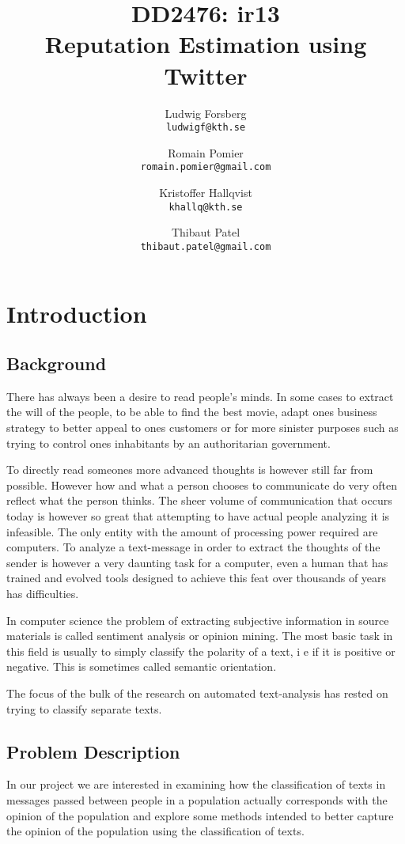 \documentclass[a4paper,12pt]{report}
\title{\TitleFontTwo DD2476: ir13 \\ \TitleFont Reputation Estimation using Twitter}
\author{Ludwig Forsberg \\ \texttt{ludwigf@kth.se} \and Romain Pomier \\ \texttt{romain.pomier@gmail.com} \and Kristoffer Hallqvist \\ \texttt{khallq@kth.se} \and Thibaut Patel \\ \texttt{thibaut.patel@gmail.com}}
\begin{document}
\maketitle
\clearpage


\tableofcontents

\clearpage
\chapter{Introduction}

\section{Background}

There has always been a desire to read people's minds.
In some cases to extract the will of the people, to be able to find the best movie, adapt ones business strategy to better appeal to ones customers or for more sinister purposes such as trying to control ones inhabitants by an authoritarian government.

To directly read someones more advanced thoughts is however still far from possible.
However how and what a person chooses to communicate do very often reflect what the person thinks.
The sheer volume of communication that occurs today is however so great that attempting to have actual people analyzing it is infeasible. 
The only entity with the amount of processing power required are computers. 
To analyze a text-message in order to extract the thoughts of the sender is however a very daunting task for a computer, even a human that has trained and evolved tools designed to achieve this feat over thousands of years has difficulties.

In computer science the problem of extracting subjective information in source materials is called sentiment analysis or opinion mining. 
The most basic task in this field is usually to simply classify the polarity of a text, i e if it is positive or negative. 
This is sometimes called semantic orientation. 

The focus of the bulk of the research on automated text-analysis has rested on trying to classify separate texts.

\section{Problem Description}
In our project we are interested in examining how the classification of texts in messages passed between people in a population actually corresponds with the opinion of the population and explore some methods intended to better capture the opinion of the population using the classification of texts. 
\end{document}
